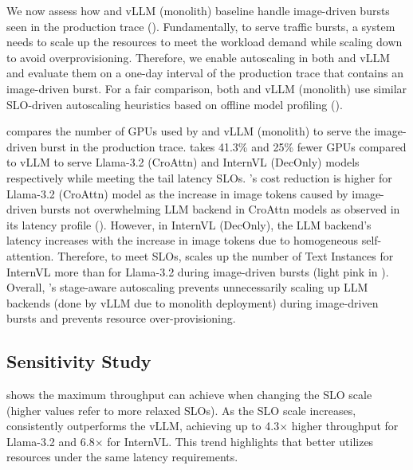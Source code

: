 

We now assess how \sysname{} and vLLM (monolith) baseline handle image-driven bursts seen in the production trace ().
Fundamentally, to serve traffic bursts, a system needs to scale up the resources to meet the workload demand while scaling down to avoid overprovisioning.
Therefore, we enable autoscaling in both \sysname{} and vLLM and evaluate them on a one-day interval of the production trace that contains an image-driven burst.
For a fair comparison, both \sysname{} and vLLM (monolith) use similar SLO-driven autoscaling heuristics based on offline model profiling ().

 compares the number of GPUs used by \sysname{} and vLLM (monolith) to serve the image-driven burst in the production trace. \sysname{} takes 41.3\% and 25\% fewer GPUs compared to vLLM to serve Llama-3.2 (CroAttn) and InternVL (DecOnly) models respectively while meeting the tail latency SLOs.
\sysname{}'s cost reduction is higher for Llama-3.2 (CroAttn) model as the increase in image tokens caused by image-driven bursts not overwhelming LLM backend in CroAttn models as observed in its latency profile ().
However, in InternVL (DecOnly), the LLM backend's latency increases with the increase in image tokens due to homogeneous self-attention.
Therefore, to meet SLOs, \sysname{} scales up the number of Text Instances for InternVL more than for Llama-3.2 during image-driven bursts (light pink in ).
Overall, \sysname{}'s stage-aware autoscaling prevents unnecessarily scaling up LLM backends (done by vLLM due to monolith deployment) during image-driven bursts and prevents resource over-provisioning.

\subsection{Sensitivity Study}
\label{sec:eval:sensitivity}



 shows the maximum throughput \sysname{} can achieve when changing the SLO scale (higher values refer to more relaxed SLOs).
As the SLO scale increases, \sysname{} consistently outperforms the vLLM, achieving up to 4.3$\times$ higher throughput for Llama-3.2 and 6.8$\times$ for InternVL.
This trend highlights that \sysname{} better utilizes resources under the same latency requirements.

